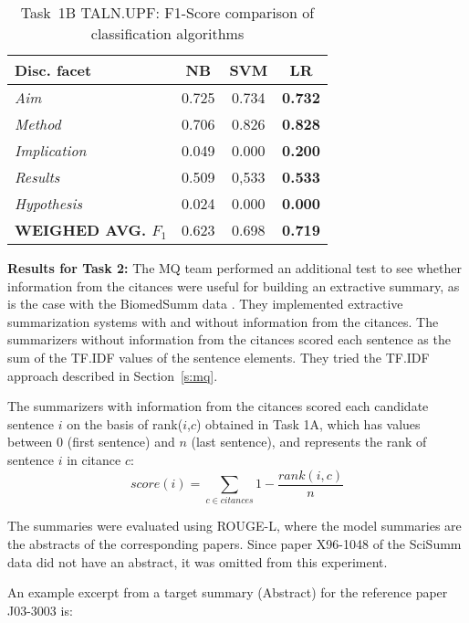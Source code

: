 \documentclass[11pt]{article}
\begin{document}
\begin{table}[h]\footnotesize
  \begin{center}
  \begin{tabular}{ | l | c | c | c |}
    \hline
    Disc. facet & NB & SVM & \textbf{LR} \\ \hline
    \textit{Aim} & 0.725 & 0.734 & \textbf{0.732} \\ \hline
    \textit{Method} & 0.706 & 0.826 & \textbf{0.828} \\ \hline
    \textit{Implication} & 0.049 & 0.000 & \textbf{0.200} \\ \hline
    \textit{Results} & 0.509 & 0,533 & \textbf{0.533} \\ \hline
    \textit{Hypothesis} & 0.024 & 0.000 &\textbf{ 0.000} \\ \hline
    \textbf{WEIGHED AVG. $F_1$} & 0.623 & 0.698 & \textbf{0.719} \\ \hline
    \hline
  \end{tabular}
  \caption{ Task~1B TALN.UPF: F1-Score comparison of classification algorithms}
  \label{table:task1bAlgorithmComp}
  \end{center}
\end{table}

\textbf{Results for Task 2:} The MQ team performed an additional test to see 
whether information from the citances were useful for building an extractive 
summary, as is the case with the BiomedSumm data \cite{Molla:ALTA2014}. 
They implemented extractive summarization systems with and without information 
from the citances.  The summarizers without information from the citances scored 
each sentence as the sum of the TF.IDF values of the sentence 
elements. They tried the TF.IDF approach described in Section~\ref{s:mq}.

The summarizers with information from the citances scored each candidate sentence 
$i$ on the basis of rank($i$,$c$) obtained in Task 1A, which has values between 0 
(first sentence) and $n$ (last sentence), and represents the rank of sentence $i$ 
in citance $c$:
\vspace{-3mm}
$$
score(i) = \sum_{c\in citances}1-\frac{rank(i,c)}{n}
$$

The summaries were evaluated using ROUGE-L, where the model summaries are the 
abstracts of the corresponding papers. Since paper X96-1048 of the SciSumm 
data did not have an abstract, it was omitted from this experiment.

An example excerpt from a target summary (Abstract) for the reference 
paper J03-3003 is:
\end{document}
